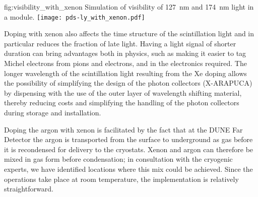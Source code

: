 \begin{dunefigure}
{fig:visibility_with_xenon}
{Simulation of visibility of \SI{127}{nm} and \SI{174}{nm} light in a  module.}
\texttt{[image: pds-ly\_with\_xenon.pdf]}
\end{dunefigure}

Doping with xenon also affects the time structure of the scintillation light and in particular reduces the fraction of late light.  Having a light signal of shorter duration can bring advantages both in physics, such as making it easier to tag Michel electrons from pions and electrons, and in the electronics required. The longer wavelength of the scintillation light resulting from the Xe doping allows the possibility of simplifying the design of the  photon collectors (X-ARAPUCA) by dispensing with the use of the outer layer of wavelength shifting material, thereby reducing costs and simplifying the handling of the photon collectors during storage and installation. 


Doping the argon with xenon is facilitated by the fact that at the DUNE Far Detector the argon is transported from the surface to underground as gas before it is recondensed for delivery to the cryostats. Xenon and argon can therefore be mixed in gas form before condensation;  in consultation with the cryogenic experts, we have identified locations where this mix could be achieved. Since the operations take place at room temperature, the implementation is relatively straightforward.



